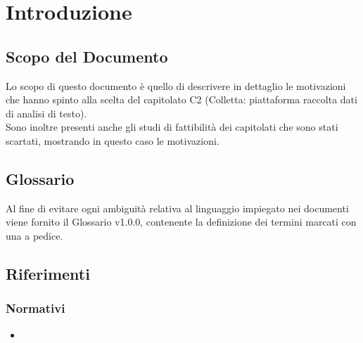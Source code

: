 \section{Introduzione}
\subsection{Scopo del Documento}
Lo scopo di questo documento è quello di descrivere in dettaglio le motivazioni che hanno spinto alla scelta del capitolato C2 (Colletta: piattaforma raccolta dati di analisi di testo).\\ Sono inoltre presenti anche gli studi di fattibilità dei capitolati che sono stati scartati, mostrando in questo caso le motivazioni.
	
\subsection{Glossario}
Al fine di evitare ogni ambiguità relativa al linguaggio impiegato nei documenti viene
fornito il Glossario v1.0.0, contenente la definizione dei termini marcati con
una a pedice.
	
\subsection{Riferimenti}

\subsubsection{Normativi}
\begin{itemize}
\item \NdPv
\end{itemize}
